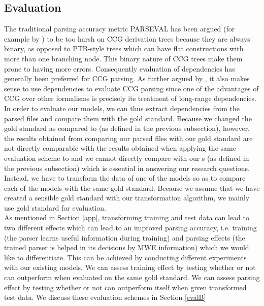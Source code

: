 \documentclass[output=paper]{LSP/langsci}
\begin{document}
    \subsection{Evaluation}
    \label{sec:eval}
    \indent The traditional parsing accuracy metric PARSEVAL has been argued (for example  by \citet{clark2002evaluating}) to be too harsh on CCG derivation trees because they are always binary, as opposed to PTB-style trees which can have flat constructions with more than one branching node. This binary nature of CCG trees make them prone to having more errors. Consequently evaluation of dependencies has generally been preferred for CCG parsing. As further argued by \citet{clark2002evaluating}, it also makes sense to use dependencies to evaluate CCG parsing since one of the advantages of CCG over other formalisms is precisely its treatment of long-range dependencies.\\
    \indent In order to evaluate our models, we can thus extract dependencies from the parsed files and compare them with the gold standard. Because we changed the gold standard as compared to \modelA (as defined in the previous subsection), however, the results obtained from comparing our parsed files with our gold standard are not directly comparable with the results obtained when applying the same evaluation scheme to \modelA and we cannot directly compare \modelA with our \modelB s (as defined in the previous subsection) which is essential in answering our research questions. Instead, we have to transform the data of one of the models so as to compare each of the models with the same gold standard. Because we assume that we have created a sensible gold standard with our transformation algorithm, we mainly use gold standard for evaluation. \\
    \indent As mentioned in Section \ref{app}, transforming training and test data can lead to two different effects which can lead to an improved parsing accuracy, i.e. training (the parser learns useful information during training) and parsing effects (the trained parser is helped in its decisions by MWE information) which we would like to differentiate. This can be achieved by conducting different experiments with our existing models. We can assess training effect by testing whether or not \modelB can outperform \modelA when evaluated on the same gold standard. We can assess parsing effect by testing whether or not \modelA can outperform itself when given transformed test data. We discuss these evaluation schemes in Section \ref{evalB} \\
\end{document}
